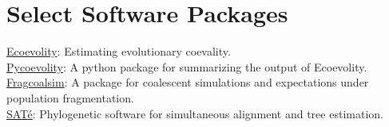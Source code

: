\section*{Select Software Packages}
% 
\noindent
\href{https://github.com/phyletica/ecoevolity}{Ecoevolity}:
    Estimating evolutionary coevality. \\
\noindent
\href{https://github.com/phyletica/sumcoevolity}{Pycoevolity}:
    A python package for summarizing the output of Ecoevolity. \\
\noindent
\href{https://github.com/joaks1/fragcoalsim}{Fragcoalsim}:
    A package for coalescent simulations and expectations under population
    fragmentation. \\
\noindent
\href{http://phylo.bio.ku.edu/software/sate/sate.html}{{SAT}\'{e}}:
    Phylogenetic software for simultaneous alignment and tree estimation.



% 

